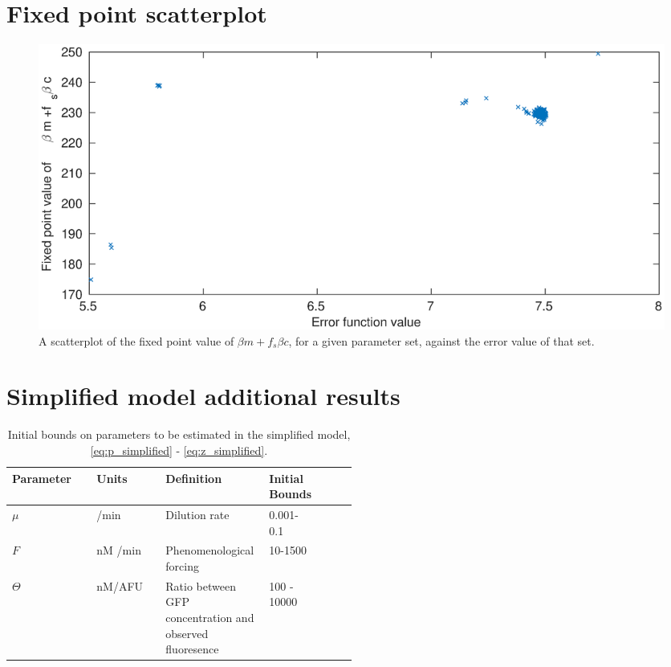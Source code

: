 \documentclass[10pt,journal]{./IEEE_latex_class/IEEEtran}
\begin{document}
\section{Fixed point scatterplot}
\label{Fixedpointscatterplot}
\setcounter{figure}{0} 

\begin{figure}[h]	
    \centering
        \includegraphics[scale = 0.25]{fixedpoint_f}
        \caption{A scatterplot of the fixed point value of $\beta m +f_{s}\beta c$, for a given parameter set, against the error value of that set. }
        \label{fixedpoint_f} 
\end{figure}

\clearpage

\section{Simplified model additional results}
\label{Simplified model additional results}
\setcounter{figure}{0} 

\begin{table}[h!]
\caption{}
\label{Simplified_model_initial_bounding_box}
\renewcommand{\arraystretch}{1.3}
\caption{Initial bounds on parameters to be estimated in the simplified model, \eqref{eq:p_simplified} - \eqref{eq:z_simplified}.}
\centering
\begin{tabular}{| l | l | p{0.3\linewidth} | p{0.1\linewidth} | p{0.1\linewidth} |}
\hline \textbf{Parameter} &  \textbf{Units} & \textbf{Definition}  & \textbf{Initial Bounds}  \\
\hline ${\mu}$ &  /min & Dilution rate  & 0.001-0.1\\
\hline ${F}$ &  nM /min & Phenomenological forcing  & 10-1500\\
\hline ${\Theta}$  &   nM/AFU & Ratio between GFP concentration and observed fluoresence  & 100 - 10000  \\
\hline
\end{tabular}
\end{table}
\end{document}
